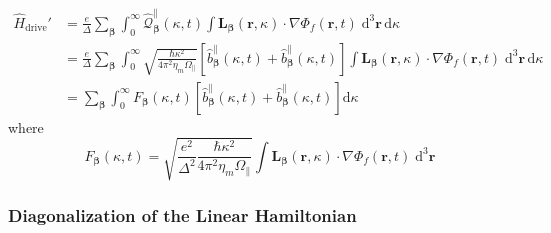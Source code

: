 \documentclass{article}
\begin{document}
\begin{equation}
\begin{split}
\hat{H}_\mathrm{drive}' &= \frac{e}{\Delta}\sum_{\bm{\beta}}\int_0^\infty\hat{\mathcal{Q}}_{\bm{\beta}}^\parallel(\kappa,t)\int\mathbf{L}_{\bm{\beta}}(\mathbf{r},\kappa)\cdot\nabla\Phi_f(\mathbf{r},t)\;\mathrm{d}^3\mathbf{r}\,\mathrm{d}\kappa\\
&= \frac{e}{\Delta}\sum_{\bm{\beta}}\int_0^\infty\sqrt{\frac{\hbar\kappa^2}{4\pi^2\eta_m\Omega_\parallel}}\left[\hat{b}_{\bm{\beta}}^\parallel(\kappa,t) + \hat{b}_{\bm{\beta}}^\parallel(\kappa,t)\right]\int\mathbf{L}_{\bm{\beta}}(\mathbf{r},\kappa)\cdot\nabla\Phi_f(\mathbf{r},t)\;\mathrm{d}^3\mathbf{r}\,\mathrm{d}\kappa\\
&= \sum_{\bm{\beta}}\int_0^\infty F_{\bm{\beta}}(\kappa,t)\left[\hat{b}_{\bm{\beta}}^\parallel(\kappa,t) + \hat{b}_{\bm{\beta}}^\parallel(\kappa,t)\right]\mathrm{d}\kappa
\end{split}
\end{equation}
where
\begin{equation}
F_{\bm{\beta}}(\kappa,t) = \sqrt{\frac{e^2}{\Delta^2}\frac{\hbar\kappa^2}{4\pi^2\eta_m\Omega_\parallel}}\int\mathbf{L}_{\bm{\beta}}(\mathbf{r},\kappa)\cdot\nabla\Phi_f(\mathbf{r},t)\;\mathrm{d}^3\mathbf{r}
\end{equation}












\subsubsection{Diagonalization of the Linear Hamiltonian}
\end{document}
